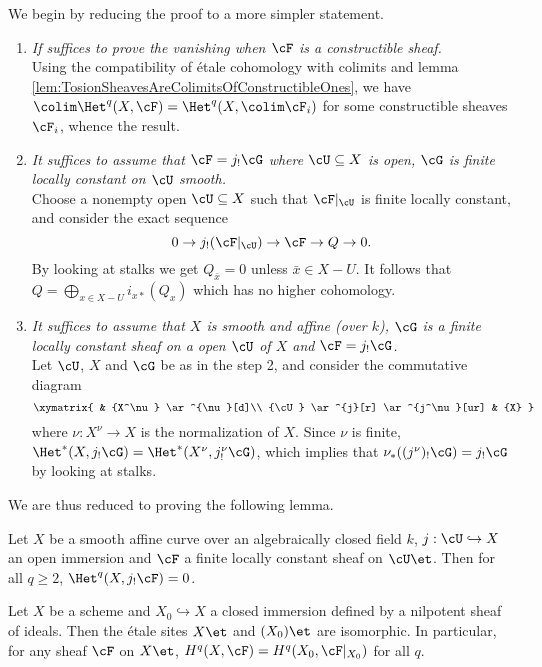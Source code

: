 We begin by reducing the proof to a more simpler statement.
\begin{enumerate}[\it Step 1.]
\item
{\it If suffices to prove the vanishing when $\cF$ is a constructible sheaf.}
\\
Using the compatibility of \'etale cohomology with colimits and lemma \ref{lem:TosionSheavesAreColimitsOfConstructibleOnes}, we have $\colim \Het^q(X, \cF) = \Het^q(X, \colim \cF_i)$ for some constructible sheaves $\cF_i$, whence the result.
\item
{\it It suffices to assume that $\cF = j_!\cG$ where $\cU\subseteq X$ is open, $\cG$ is finite locally constant on $\cU$ smooth.}
\\
Choose a nonempty open $\cU\subseteq X$ such that $\cF|_\cU$ is finite locally constant, and consider the exact sequence
$$
0\to j_!(\cF|_\cU)\to \cF\to Q\to 0.
$$
By looking at stalks we get $Q_{\bar x}=0$ unless $\bar x\in X-U$. It follows that $\displaystyle Q = \bigoplus_{x\in X-U} i_{x*} (Q_x)$
which has no higher cohomology.
\item
{\it It suffices to assume that $X$ is smooth and affine (over $k$), $\cG$ is a finite locally constant sheaf on a open $\cU$ of $X$ and $\cF = j_!\cG$.}
\\
Let $\cU$, $X$ and $\cG$ be as in the step 2, and consider the commutative diagram
$$\xymatrix{
& {X^\nu} \ar^{\nu}[d]\\
{\cU} \ar^{j}[r] \ar^{j^\nu}[ur] & {X}
} 
$$
where $\nu: X^\nu \to X$ is the normalization of $X$. Since $\nu$ is finite, $\Het^*(X, j_!\cG) = \Het^*(X^\nu, j^\nu_!\cG)$, which implies that $\nu_*((j^\nu)_!\cG) = j_!\cG$ by looking at stalks. 
\end{enumerate}

We are thus reduced to proving the following lemma.

\begin{lem} \label{lem:VanishingForSmoothAffineCurvesAndSimpleSheaves}
Let $X$ be a smooth affine curve over an algebraically closed field $k$, $j: \cU \hookrightarrow X$ an open immersion and $\cF$ a finite locally constant sheaf on $\cU\et$. Then for all $q \geqslant 2$, $\Het^q(X, j_! \cF) = 0$.
\end{lem}

\begin{prop} 
Let $X$ be a scheme and $X_0\hookrightarrow X$ a closed immersion defined by a nilpotent sheaf of ideals. Then the \'etale sites $X\et$ and $(X_0)\et$ are isomorphic. In particular, for any sheaf $\cF$ on $X\et$, $H^q(X, \cF) = H^q(X_0, \cF|_{X_0})$ for all $q$.
\end{prop}

